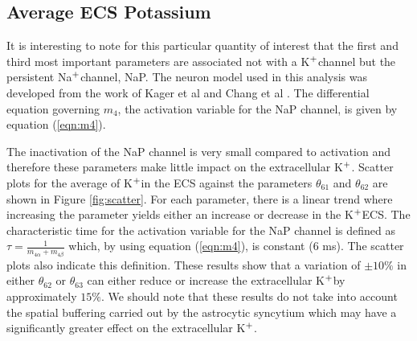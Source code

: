 \documentclass[smallextended]{svjour3}
\numberwithin{equation}{section}
\newcommand{\na}{Na$^{\text{\scriptsize +}}$}
\newcommand{\pot}{K$^{\text{\scriptsize +}}$}
\begin{document}
\subsection{Average ECS Potassium}
It is interesting to note for this particular quantity of interest that the first and third most important parameters are associated not with a \pot channel but the persistent \na channel, NaP.  The neuron model used in this analysis was developed from the work of Kager et al \cite{Kager2000a} and Chang et al \cite{Chang2013}.
The differential equation governing $m_4$,  the activation variable for the NaP channel, is given by equation (\ref{eqn:m4}).

The inactivation of the NaP channel is very small compared to activation and therefore these parameters make little impact on the extracellular \pot. 
Scatter plots for the average of \pot in the  ECS against the parameters $\theta_{61}$ and $\theta_{62}$ are shown in Figure \ref{fig:scatter}.  For each parameter, there is a linear trend where increasing the parameter yields either an increase or decrease in the \pot ECS. The characteristic time for the activation variable for the NaP channel is defined as $\tau=\frac{1}{m_{4 \alpha}+m_{4 \beta}}$ which, by using equation (\ref{eqn:m4}), is constant (6 ms). The scatter plots also indicate this definition. These results show that a variation of $\pm 10 \%$ in either $\theta_{62}$ or $\theta_{63}$ can either reduce or increase the extracellular \pot  by approximately $15 \%$. We should note that these results do not take into account the spatial buffering carried out by the astrocytic syncytium which may have a significantly greater effect on the extracellular \pot \cite{Bellot-Saez2017,Kenny2018b}. 
\end{document}
